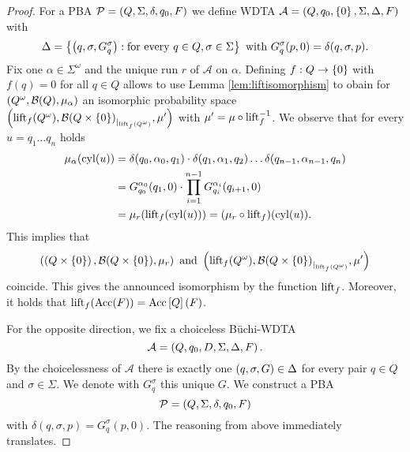 \begin{proof}
  For a \ac{PBA} $\mathcal{P} = \left(Q, \Sigma, \delta, q_{0}, F\right)$ we define
  \ac{WDTA} $\mathcal{A} = \left(Q, q_{0}, \left\{0\right\}, \Sigma, \Delta, F\right)$ with
  \begin{equation*}
    \Delta = \left\{
      \left(q,\sigma,G_{q}^{\sigma}\right):\text{for every }q\in Q,\sigma\in\Sigma
    \right\}\text{ with }G_{q}^{\sigma}(p, 0) = \delta(q,\sigma,p).
  \end{equation*}
  Fix one $\alpha\in\Sigma^{\omega}$ and the unique run $r$ of $\mathcal{A}$ on
  $\alpha$. Defining $f:Q\rightarrow\left\{0\right\}$ with $f(q) = 0$ for all $q\in Q$
  allows to use Lemma \ref{lem:liftisomorphism} to obain for
  $\left(Q^{\omega}, \mathcal{B}(Q), \mu_{\alpha}\right)$ an isomorphic
  probability space $\left(\operatorname{lift}_{f}(Q^{\omega}), 
  {\mathcal{B}(Q\times\left\{0\right\})}_{|_{\operatorname{lift}_{f}(Q^{\omega})}}, \mu'\right)$ with
  $\mu' = \mu\circ\operatorname{lift}_{f}^{-1}$. We observe that for every $u = q_{1}\dots
  q_{n}$ holds
  \begin{align*}
    \mu_{\alpha}(\operatorname{cyl}(u)) &=\delta(q_{0},\alpha_{0},q_{1})\cdot
      \delta(q_{1},\alpha_{1},q_{2})\dots\delta(q_{n-1},\alpha_{n-1},q_{n})\\
    &= G_{q_{0}}^{\alpha_{0}}(q_{1},0)\cdot
      \prod\limits_{i=1}^{n-1}G_{q_{i}}^{\alpha_{i}}(q_{i+1}, 0)\\
    &= \mu_{r}(\operatorname{lift}_{f}(\operatorname{cyl}(u))) = (\mu_{r}\circ \operatorname{lift}_{f})(\operatorname{cyl}(u)).
  \end{align*}
  This implies that 
  \begin{equation*}
    \left(\left(Q\times\left\{0\right\}\right), \mathcal{B}(Q\times\left\{0\right\}), \mu_{r}\right)
    \text{ and }
    \left(\operatorname{lift}_{f}(Q^{\omega}), 
    {\mathcal{B}(Q\times\left\{0\right\})}_{|_{\operatorname{lift}_{f}(Q^{\omega})}}, \mu'\right)
  \end{equation*}
  coincide. This gives the announced isomorphism by the function $\operatorname{lift}_{f}$.
  Moreover, it holds that $\operatorname{lift}_{f}(\operatorname{Acc}(F)) = \operatorname{Acc}\left[Q\right](F)$.

  For the opposite direction, we fix a choiceless Büchi-\ac{WDTA}
  \begin{equation*}
    \mathcal{A} = \left(Q, q_{0}, D , \Sigma, \Delta, F\right).
  \end{equation*}
  By the choicelessness of $\mathcal{A}$ there is exactly one 
  $\left(q,\sigma, G\right)\in\Delta$ for every pair $q\in Q$ and $\sigma\in\Sigma$.
  We denote with $G_{q}^{\sigma}$ this unique $G$. We construct a \ac{PBA}
  \begin{equation*}
    \mathcal{P} = \left(Q, \Sigma, \delta, q_{0}, F\right)
  \end{equation*}
  with $\delta(q,\sigma, p) = G_{q}^{\sigma}(p, 0)$. The reasoning from above
  immediately translates.
\end{proof}


